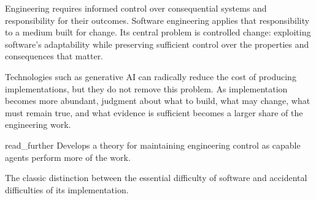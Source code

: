 Engineering requires informed control over consequential systems and responsibility for their outcomes.
Software engineering applies that responsibility to a medium built for change. Its central problem is
controlled change: exploiting software's adaptability while preserving sufficient control over the
properties and consequences that matter.

Technologies such as generative AI can radically reduce the cost of producing implementations, but they
do not remove this problem. As implementation becomes more abundant, judgment about what to build, what
may change, what must remain true, and what evidence is sufficient becomes a larger share of the
engineering work.

\begin{bookbox}{read_further}{} %
\citep{davis2026mage} Develops a theory for maintaining engineering control as capable agents perform more of the work.

\citep{brooks1987} The classic distinction between the essential difficulty of software and accidental difficulties of its implementation.
\end{bookbox}
